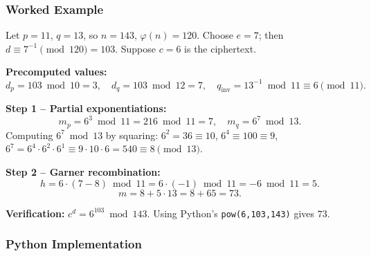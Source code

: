\subsubsection*{Worked Example}

\begin{example}
Let $p = 11$, $q = 13$, so $n = 143$, $\varphi(n) = 120$. Choose $e = 7$; then
$d \equiv 7^{-1} \pmod{120} = 103$. Suppose $c = 6$ is the ciphertext.

\medskip
\textbf{Precomputed values:}
\[
  d_p = 103 \bmod 10 = 3, \quad d_q = 103 \bmod 12 = 7, \quad
  q_{\text{inv}} = 13^{-1} \bmod 11 \equiv 6 \pmod{11}.
\]

\textbf{Step 1 -- Partial exponentiations:}
\[
  m_p = 6^3 \bmod 11 = 216 \bmod 11 = 7, \quad
  m_q = 6^7 \bmod 13.
\]
Computing $6^7 \bmod 13$ by squaring: $6^2=36\equiv 10$, $6^4\equiv 100\equiv 9$,
$6^7 = 6^4 \cdot 6^2 \cdot 6^1 \equiv 9 \cdot 10 \cdot 6 = 540 \equiv 8 \pmod{13}$.

\textbf{Step 2 -- Garner recombination:}
\[
  h = 6 \cdot (7 - 8) \bmod 11 = 6 \cdot (-1) \bmod 11 = -6 \bmod 11 = 5.
\]
\[
  m = 8 + 5 \cdot 13 = 8 + 65 = 73.
\]

\textbf{Verification:} $c^d = 6^{103} \bmod 143$. Using Python's \texttt{pow(6,103,143)}
gives $73$. \checkmark
\end{example}
\newpage
\subsubsection*{Python Implementation}

